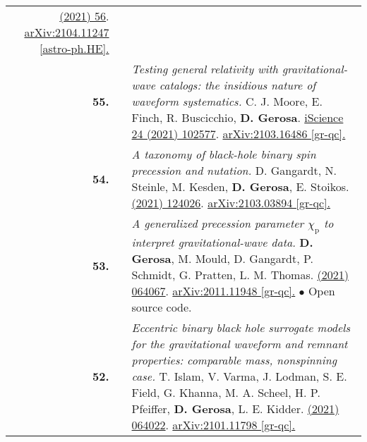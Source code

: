 {\begin{longtable}{rp{0.3cm}p{15.8cm}}
\href{https://iopscience.iop.org/article/10.3847/1538-4357/ac00bb}{\apj 915 (2021) 56}. \href{https://arxiv.org/abs/2104.11247}{arXiv:2104.11247   [astro-ph.HE].}
\vspace{0.09cm}\\
%
\textbf{55.} & & \textit{Testing general relativity with gravitational-wave catalogs: the insidious nature of waveform systematics.}
\newline{}
C. J. Moore, E. Finch, R. Buscicchio, \textbf{D. Gerosa}.
\newline{}
\href{https://www.sciencedirect.com/science/article/pii/S2589004221005459}{iScience 24 (2021) 102577}. \href{https://arxiv.org/abs/2103.16486}{arXiv:2103.16486   [gr-qc].}
\vspace{0.09cm}\\
%
\textbf{54.} & & \textit{A taxonomy of black-hole binary spin precession and nutation.}
\newline{}
D. Gangardt, N. Steinle, M. Kesden, \textbf{D. Gerosa}, E. Stoikos.
\newline{}
\href{https://journals.aps.org/prd/abstract/10.1103/PhysRevD.103.124026}{\prd 103 (2021) 124026}. \href{https://arxiv.org/abs/2103.03894}{arXiv:2103.03894 [gr-qc].}
\vspace{0.09cm}\\
%
\textbf{53.} & & \textit{A generalized precession parameter $\chi_\mathrm{p}$ to interpret gravitational-wave data.}
\newline{}
\textbf{D. Gerosa}, M. Mould, D. Gangardt, P. Schmidt, G. Pratten, L. M. Thomas.
\newline{}
\href{https://journals.aps.org/prd/abstract/10.1103/PhysRevD.103.064067}{\prd 103 (2021) 064067}. \href{https://arxiv.org/abs/2011.11948}{arXiv:2011.11948 [gr-qc].}
\newline{}
\textcolor{color1}{$\bullet$} Open source code.
\vspace{0.09cm}\\
%
\textbf{52.} & & \textit{Eccentric binary black hole surrogate models for the gravitational waveform and remnant properties: comparable mass, nonspinning case.}
\newline{}
T. Islam, V. Varma, J. Lodman, S. E. Field, G. Khanna, M. A. Scheel, H. P. Pfeiffer,  \textbf{D. Gerosa}, L. E. Kidder.
\newline{}
\href{https://journals.aps.org/prd/abstract/10.1103/PhysRevD.103.064022}{\prd 103 (2021) 064022}. \href{https://arxiv.org/abs/2101.11798}{arXiv:2101.11798 [gr-qc].}
\vspace{0.09cm}\\

\end{longtable}}
